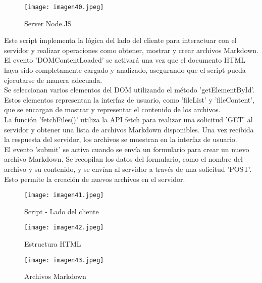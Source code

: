 \documentclass[10pt, a4paper]{article}
\begin{document}
	\begin{figure}[h]
		\centering
		\texttt{[image: imagen40.jpeg]}
		\caption{Server Node.JS}
	\end{figure}
	\vspace*{1.5cm}
	\begin{flushleft}
	Este script implementa la lógica del lado del cliente para interactuar con el servidor y realizar operaciones como obtener, mostrar y crear archivos Markdown. El evento 'DOMContentLoaded' se activará una vez que el documento HTML haya sido completamente cargado y analizado, asegurando que el script pueda ejecutarse de manera adecuada.\\
	Se seleccionan varios elementos del DOM utilizando el método 'getElementById'. Estos elementos representan la interfaz de usuario, como 'fileList' y 'fileContent', que se encargan de mostrar y representar el contenido de los archivos.\\
	La función 'fetchFiles()' utiliza la API fetch para realizar una solicitud 'GET' al servidor y obtener una lista de archivos Markdown disponibles. Una vez recibida la respuesta del servidor, los archivos se muestran en la interfaz de usuario.\\
	El evento 'submit' se activa cuando se envía un formulario para crear un nuevo archivo Markdown. Se recopilan los datos del formulario, como el nombre del archivo y su contenido, y se envían al servidor a través de una solicitud 'POST'. Esto permite la creación de nuevos archivos en el servidor.
	\end{flushleft}
	\begin{figure}[h]
		\centering
		\texttt{[image: imagen41.jpeg]}
		\caption{Script - Lado del cliente}
	\end{figure}
	\begin{figure}[h]
		\centering
		\texttt{[image: imagen42.jpeg]}
		\caption{Estructura HTML}
	\end{figure}
	\begin{figure}[h]
		\centering
		\texttt{[image: imagen43.jpeg]}
		\caption{Archivos Markdown}
	\end{figure}
	
\end{document}
